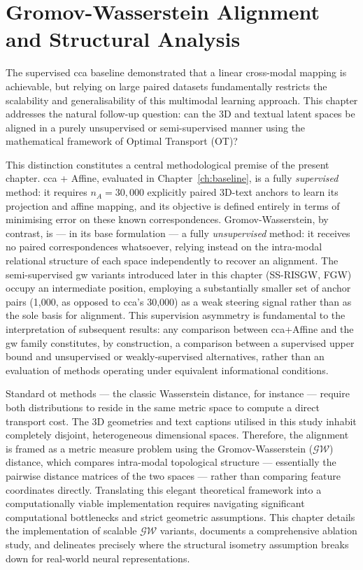 \chapter{Gromov-Wasserstein Alignment and Structural Analysis}
\label{ch:gw_alignment}

The supervised \gls{cca} baseline demonstrated that a linear cross-modal mapping is achievable, but relying on large paired datasets fundamentally restricts the scalability and generalisability of this multimodal learning approach. This chapter addresses the natural follow-up question: can the 3D and textual latent spaces be aligned in a purely unsupervised or semi-supervised manner using the mathematical framework of Optimal Transport (OT)?

This distinction constitutes a central methodological premise of the present chapter. \gls{cca} + Affine, evaluated in Chapter~\ref{ch:baseline}, is a fully \emph{supervised} method: it requires $n_A = 30{,}000$ explicitly paired 3D-text anchors to learn its projection and affine mapping, and its objective is defined entirely in terms of minimising error on these known correspondences. Gromov-Wasserstein, by contrast, is --- in its base formulation --- a fully \emph{unsupervised} method: it receives no paired correspondences whatsoever, relying instead on the intra-modal relational structure of each space independently to recover an alignment. The semi-supervised \gls{gw} variants introduced later in this chapter (SS-RISGW, FGW) occupy an intermediate position, employing a substantially smaller set of anchor pairs (1,000, as opposed to \gls{cca}'s 30,000) as a weak steering signal rather than as the sole basis for alignment. This supervision asymmetry is fundamental to the interpretation of subsequent results: any comparison between \gls{cca}+Affine and the \gls{gw} family constitutes, by construction, a comparison between a supervised upper bound and unsupervised or weakly-supervised alternatives, rather than an evaluation of methods operating under equivalent informational conditions.

Standard \gls{ot} methods --- the classic Wasserstein distance, for instance --- require both distributions to reside in the same metric space to compute a direct transport cost. The 3D geometries and text captions utilised in this study inhabit completely disjoint, heterogeneous dimensional spaces. Therefore, the alignment is framed as a metric measure problem using the Gromov-Wasserstein ($\mathcal{GW}$) distance, which compares intra-modal topological structure --- essentially the pairwise distance matrices of the two spaces --- rather than comparing feature coordinates directly. Translating this elegant theoretical framework into a computationally viable implementation requires navigating significant computational bottlenecks and strict geometric assumptions. This chapter details the implementation of scalable $\mathcal{GW}$ variants, documents a comprehensive ablation study, and delineates precisely where the structural isometry assumption breaks down for real-world neural representations.

